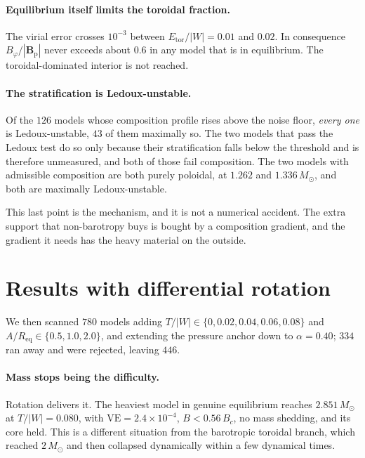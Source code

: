 \documentclass{aa}
\begin{document}
\paragraph{Equilibrium itself limits the toroidal fraction.} The virial
error crosses $10^{-3}$ between $E_{\mathrm{tor}}/|W| = 0.01$ and
$0.02$. In consequence $B_\varphi/|\mathbf{B}_{\mathrm{p}}|$ never
exceeds about $0.6$ in any model that is in equilibrium. The
toroidal-dominated interior is not reached.

\paragraph{The stratification is Ledoux-unstable.} Of the $126$ models
whose composition profile rises above the noise floor, \emph{every one}
is Ledoux-unstable, $43$ of them maximally so. The two models that pass
the Ledoux test do so only because their stratification falls below the
threshold and is therefore unmeasured, and both of those fail
composition. The two models with admissible composition are both purely
poloidal, at $1.262$ and $1.336\,M_\odot$, and both are maximally
Ledoux-unstable.

This last point is the mechanism, and it is not a numerical accident.
The extra support that non-barotropy buys is bought by a composition
gradient, and the gradient it needs has the heavy material on the
outside.


\section{Results with differential rotation}
\label{sec:results-rot}

We then scanned $780$ models adding
$T/|W| \in \{0, 0.02, 0.04, 0.06, 0.08\}$ and
$A/R_{\mathrm{eq}} \in \{0.5, 1.0, 2.0\}$, and extending the pressure
anchor down to $\alpha = 0.40$; $334$ ran away and were rejected, leaving
$446$.

\paragraph{Mass stops being the difficulty.} Rotation delivers it. The
heaviest model in genuine equilibrium reaches $2.851\,M_\odot$ at
$T/|W| = 0.080$, with $\mathrm{VE} = 2.4\times10^{-4}$, $B < 0.56\,B_c$,
no mass shedding, and its core held. This is a different situation from
the barotropic toroidal branch, which reached $2\,M_\odot$ and then
collapsed dynamically within a few dynamical times.
\end{document}
